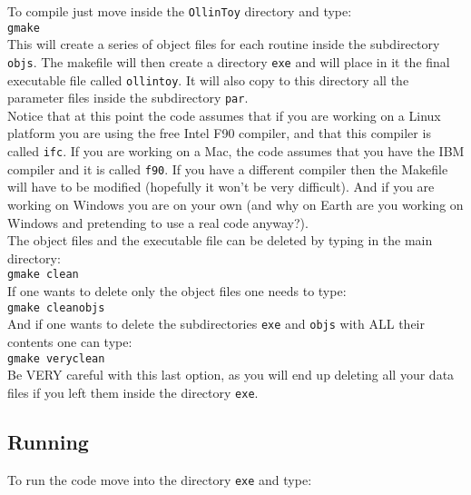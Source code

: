 \documentclass[12pt]{article}
\begin{document}
To compile just move inside the \texttt{OllinToy} directory and type: \\

\texttt{gmake} \\

This will create a series of object files for each routine inside the
subdirectory \texttt{objs}.  The makefile will then create a directory
\texttt{exe} and will place in it the final executable file called
\texttt{ollintoy}.  It will also copy to this directory all the parameter
files inside the subdirectory \texttt{par}. \\

Notice that at this point the code assumes that if you are working on
a Linux platform you are using the free Intel F90 compiler, and that
this compiler is called \texttt{ifc}.  If you are working on a Mac,
the code assumes that you have the IBM compiler and it is called
\texttt{f90}.  If you have a different compiler then the Makefile will
have to be modified (hopefully it won't be very difficult).  And if
you are working on Windows you are on your own (and why on Earth are
you working on Windows and pretending to use a real code anyway?). \\

The object files and the executable file can be deleted by typing in
the main directory: \\

\texttt{gmake clean} \\

If one wants to delete only the object files one needs to type: \\

\texttt{gmake cleanobjs} \\

And if one wants to delete the subdirectories \texttt{exe} and
\texttt{objs} with ALL their contents one can type: \\

\texttt{gmake veryclean} \\

Be VERY careful with this last option, as you will end up deleting all
your data files if you left them inside the directory \texttt{exe}.


\subsection{Running}
\label{sec:running}

To run the code move into the directory \texttt{exe} and type: \\
\end{document}
